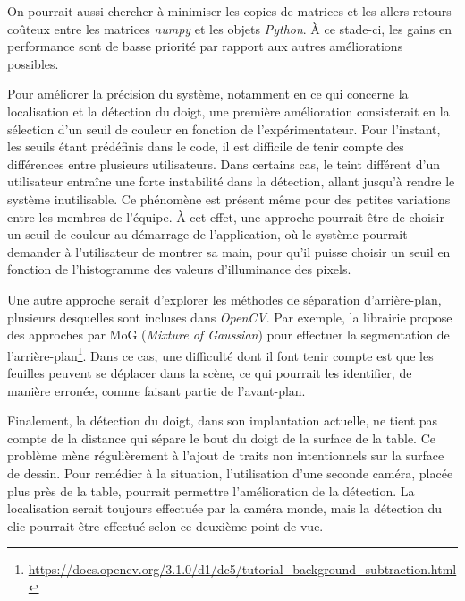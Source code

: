 \documentclass[11pt]{report}
\begin{document}
On pourrait aussi chercher à minimiser les copies de matrices et les
allers-retours coûteux entre les matrices \textit{numpy} et les objets
\textit{Python}. À ce stade-ci, les gains en performance sont de basse priorité
par rapport aux autres améliorations possibles.

Pour améliorer la précision du système, notamment en ce qui concerne la
localisation et la détection du doigt, une première amélioration consisterait en
la sélection d'un seuil de couleur en fonction de l'expérimentateur. Pour
l'instant, les seuils étant prédéfinis dans le code, il est difficile de tenir
compte des différences entre plusieurs utilisateurs. Dans certains cas, le teint
différent d'un utilisateur entraîne une forte instabilité dans la détection,
allant jusqu'à rendre le système inutilisable. Ce phénomène est présent même
pour des petites variations entre les membres de l'équipe. À cet effet, une
approche pourrait être de choisir un seuil de couleur au démarrage de
l'application, où le système pourrait demander à l'utilisateur de montrer sa
main, pour qu'il puisse choisir un seuil en fonction de l'histogramme des
valeurs d'illuminance des pixels.

Une autre approche serait d'explorer les méthodes de séparation d'arrière-plan,
plusieurs desquelles sont incluses dans \textit{OpenCV}. Par exemple, la
librairie propose des approches par MoG (\textit{Mixture of Gaussian}) pour
effectuer la segmentation de
l'arrière-plan\footnote{\url{https://docs.opencv.org/3.1.0/d1/dc5/tutorial_background_subtraction.html}}.
Dans ce cas, une difficulté dont il font tenir compte est que les feuilles
peuvent se déplacer dans la scène, ce qui pourrait les identifier, de manière
erronée, comme faisant partie de l'avant-plan. 

Finalement, la détection du doigt, dans son implantation actuelle, ne tient pas
compte de la distance qui sépare le bout du doigt de la surface de la table. Ce
problème mène régulièrement à l'ajout de traits non intentionnels sur la surface de
dessin. Pour remédier à la situation, l'utilisation d'une seconde caméra, placée
plus près de la table, pourrait permettre l'amélioration de la détection. La
localisation serait toujours effectuée par la caméra monde, mais la détection du
clic pourrait être effectué selon ce deuxième point de vue. 
\end{document}
